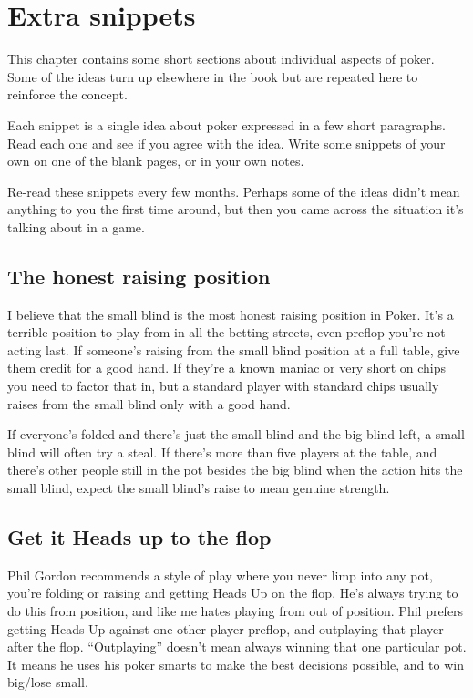 \chapter{Extra snippets}


This chapter contains some short sections about individual aspects
of poker. Some of the ideas turn up elsewhere in the book but are
repeated here to reinforce the concept.

Each snippet is a single idea about poker expressed in a few
short paragraphs. Read each one and see if you agree with the idea.
Write some snippets of your own on one of the blank pages, or
in your own notes.

Re-read these snippets every few months. Perhaps some of the
ideas didn't mean anything to you the first time around, but
then you came across the situation it's talking about in
a game.

\section{The honest raising position}

I believe that the small blind is the most honest raising
position in Poker. It's a terrible position to play from
in all the betting streets, even preflop you're not
acting last. If someone's raising from the small blind
position at a full table, give them credit for a good hand.
If they're a known maniac or very short on chips you need to
factor that in, but a standard player with standard chips usually
raises from the small blind only with a good hand.

If everyone's folded and there's just the small blind and the
big blind left, a small blind will often try a steal. If there's
more than five players at the table, and there's other people
still in the pot besides the big blind when the action hits the small
blind, expect the small blind's raise to mean genuine strength.

\section{Get it Heads up to the flop}

Phil Gordon recommends a style of play where you never limp into any pot,
you're folding or raising and getting Heads Up on the flop. He's always trying
to do this from position, and like me hates playing from out of position.
Phil prefers getting Heads Up against one other player preflop, and
outplaying that player after the flop. ``Outplaying'' doesn't mean
always winning that one particular pot. It means he uses his poker
smarts to make the best decisions possible, and to win big/lose small.

